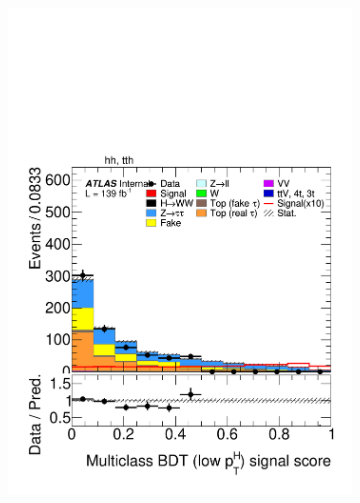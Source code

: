 \begin{figure}[!htbp]
  \centering
  
  \begin{subfigure}[b]{0.495\textwidth}
    \centering
    \includegraphics[width=\linewidth]{images/plots_overtrain_lt200/plot_tth_signal_multiclass_lt200_hh_tth.pdf}

    \label{fig:plot_tth_signal_lowpt}
  \end{subfigure}
  
  

\end{figure}
